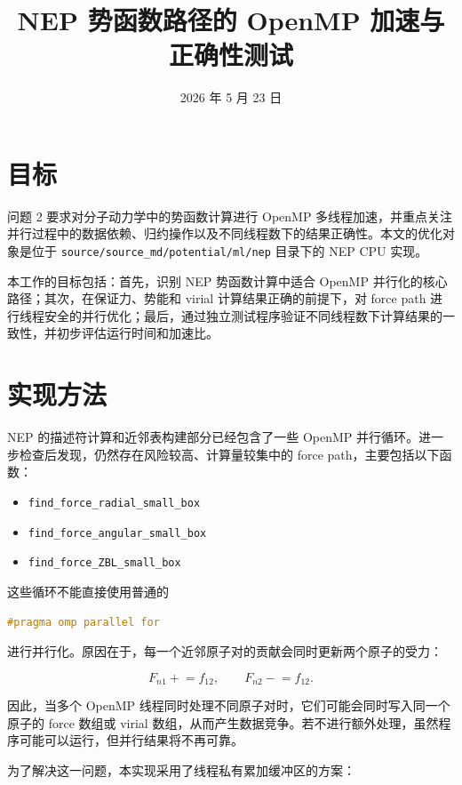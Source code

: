 \documentclass[11pt]{article}
\title{NEP 势函数路径的 OpenMP 加速与正确性测试}
\author{}
\date{2026 年 5 月 23 日}
\begin{document}
\maketitle

\section{目标}

问题 2 要求对分子动力学中的势函数计算进行 OpenMP 多线程加速，并重点关注并行过程中的数据依赖、归约操作以及不同线程数下的结果正确性。本文的优化对象是位于
\texttt{source/source\_md/potential/ml/nep} 目录下的 NEP CPU 实现。

本工作的目标包括：首先，识别 NEP 势函数计算中适合 OpenMP 并行化的核心路径；其次，在保证力、势能和 virial 计算结果正确的前提下，对 force path 进行线程安全的并行优化；最后，通过独立测试程序验证不同线程数下计算结果的一致性，并初步评估运行时间和加速比。

\section{实现方法}

NEP 的描述符计算和近邻表构建部分已经包含了一些 OpenMP 并行循环。进一步检查后发现，仍然存在风险较高、计算量较集中的 force path，主要包括以下函数：

\begin{itemize}
  \item \texttt{find\_force\_radial\_small\_box}
  \item \texttt{find\_force\_angular\_small\_box}
  \item \texttt{find\_force\_ZBL\_small\_box}
\end{itemize}

这些循环不能直接使用普通的

\begin{lstlisting}[language=C++]
#pragma omp parallel for
\end{lstlisting}

进行并行化。原因在于，每一个近邻原子对的贡献会同时更新两个原子的受力：

\[
  F_{n1} \mathrel{+}= f_{12}, \qquad F_{n2} \mathrel{-}= f_{12}.
\]

因此，当多个 OpenMP 线程同时处理不同原子对时，它们可能会同时写入同一个原子的 force 数组或 virial 数组，从而产生数据竞争。若不进行额外处理，虽然程序可能可以运行，但并行结果将不再可靠。

为了解决这一问题，本实现采用了线程私有累加缓冲区的方案：
\end{document}
